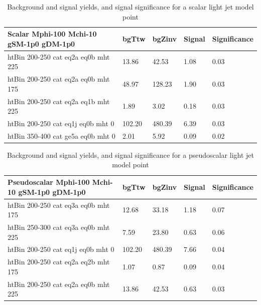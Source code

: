 \begin{table}
\small
\begin{center}
\caption{Background and signal yields, and signal significance for a scalar light jet model point}
\label{tab:MSB_S_g1_2fb}
\begin{tabular}{|l|l|l|l|l|}
\textbf{Scalar Mphi-100 Mchi-10 gSM-1p0 gDM-1p0}    &  bgTtw    &  bgZinv   &  Signal &
Significance \\ 
\hline
htBin 200-250 cat eq2a eq0b mht 225 &   13.86    &  42.53    &  1.08    &0.03 \\ 
htBin 200-250 cat eq2a eq0b mht 175 &   48.97    &  128.23   &  1.90    &0.03 \\ 
htBin 200-250 cat eq2a eq1b mht 225 &   1.89     &  3.02     &  0.18    &0.03 \\ 
htBin 200-250 cat eq1j eq0b mht 0 &     102.20   &  480.39   &  6.39    &0.03 \\ 
htBin 350-400 cat ge5a eq0b mht 0 &     2.01     &  5.92     &  0.09    &0.02 \\ 
\end{tabular}
\end{center}
\end{table}

\begin{table}
\small
\begin{center}
\caption{Background and signal yields, and signal significance for a pseudoscalar light jet model point}
\label{tab:MSB_P_g1_2fb}
\begin{tabular}{|l|l|l|l|l|}
\textbf{Pseudoscalar Mphi-100 Mchi-10 gSM-1p0 gDM-1p0}  &  bgTtw    &  bgZinv   &  Signal &
Significance \\ 
\hline
htBin 200-250 cat eq3a eq0b mht 175 &   12.68    &  33.18    &  1.18    &0.07 \\ 
htBin 250-300 cat eq3a eq0b mht 225 &   7.59     &  23.80    &  0.63    &0.06 \\ 
htBin 200-250 cat eq1j eq0b mht 0 &     102.20   &  480.39   &  7.66    &0.04 \\ 
htBin 200-250 cat eq2a eq2b mht 175 &   1.07     &  0.87     &  0.09    &0.04 \\ 
htBin 200-250 cat eq2a eq0b mht 225 &   13.86    &  42.53    &  0.63    &0.03 \\ 
\end{tabular}
\end{center}
\end{table}


\clearpage

